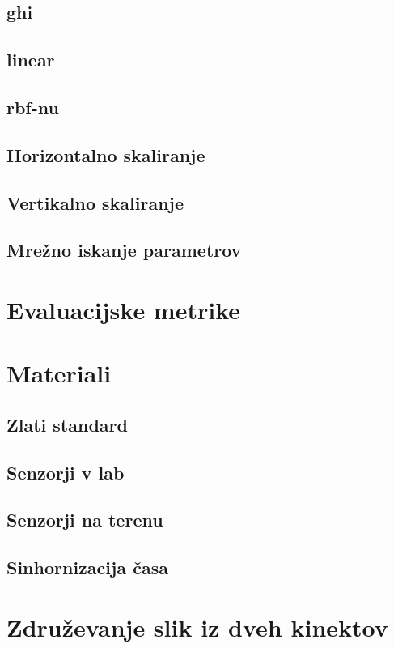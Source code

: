 \subsection{ghi}
\subsection{linear}
\subsection{rbf-nu}
\subsection{Horizontalno skaliranje}
\subsection{Vertikalno skaliranje}
\subsection{Mrežno iskanje parametrov}

\section{Evaluacijske metrike}


\section{Materiali}
\subsection{Zlati standard}
\subsection{Senzorji v lab}
\subsection{Senzorji na terenu}
\subsection{Sinhornizacija časa}


\section{Združevanje slik iz dveh kinektov}
